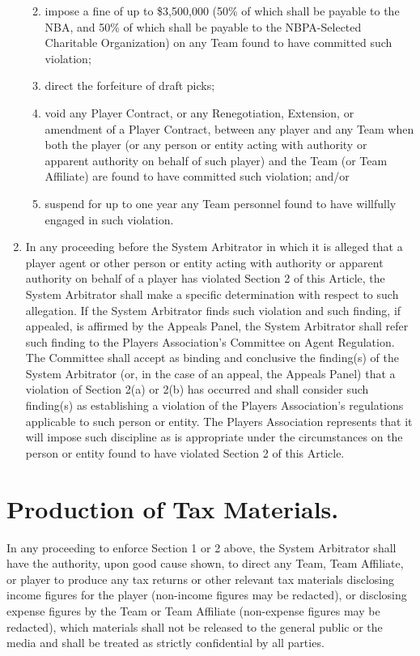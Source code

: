 \documentclass[
]{book}
\providecommand{\tightlist}{%
  \setlength{\itemsep}{0pt}\setlength{\parskip}{0pt}}
\begin{document}
\begin{enumerate}
  \begin{enumerate}
  \def\labelenumii{(\roman{enumii})}
  \tightlist
  \item
    impose a fine of up to \$3,500,000 (50\% of which shall be payable to the NBA, and 50\% of which shall be payable to the NBPA-Selected Charitable Organization) on any Team found to have committed such violation;
  \item
    direct the forfeiture of draft picks;
  \item
    void any Player Contract, or any Renegotiation, Extension, or amendment of a Player Contract, between any player and any Team when both the player (or any person or entity acting with authority or apparent authority on behalf of such player) and the Team (or Team Affiliate) are found to have committed such violation; and/or
  \item
    suspend for up to one year any Team personnel found to have willfully engaged in such violation.
  \end{enumerate}
\item
  In any proceeding before the System Arbitrator in which it is alleged that a player agent or other person or entity acting with authority or apparent authority on behalf of a player has violated Section 2 of this Article, the System Arbitrator shall make a specific determination with respect to such allegation. If the System Arbitrator finds such violation and such finding, if appealed, is affirmed by the Appeals Panel, the System Arbitrator shall refer such finding to the Players Association's Committee on Agent Regulation. The Committee shall accept as binding and conclusive the finding(s) of the System Arbitrator (or, in the case of an appeal, the Appeals Panel) that a violation of Section 2(a) or 2(b) has occurred and shall consider such finding(s) as establishing a violation of the Players Association's regulations applicable to such person or entity. The Players Association represents that it will impose such discipline as is appropriate under the circumstances on the person or entity found to have violated Section 2 of this Article.
\end{enumerate}

\hypertarget{production-of-tax-materials.}{%
\section{Production of Tax Materials.}\label{production-of-tax-materials.}}

In any proceeding to enforce Section 1 or 2 above, the System Arbitrator shall have the authority, upon good cause shown, to direct any Team, Team Affiliate, or player to produce any tax returns or other relevant tax materials disclosing income figures for the player (non-income figures may be redacted), or disclosing expense figures by the Team or Team Affiliate (non-expense figures may be redacted), which materials shall not be released to the general public or the media and shall be treated as strictly confidential by all parties.
\end{document}
